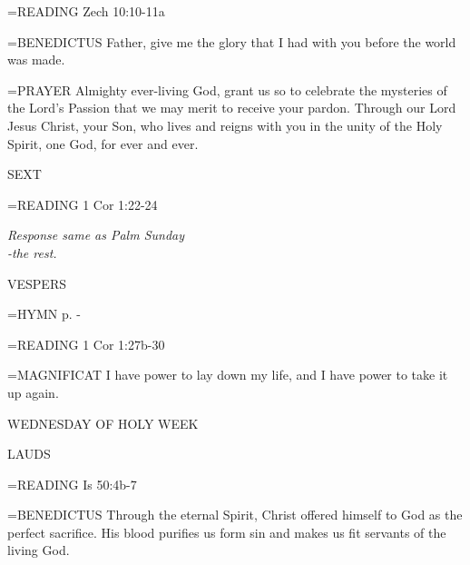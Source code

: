 \hangindent=\parindent \small{\uppercase{READING}}    Zech 10:10-11a \textbf{   \\}

\hangindent=\parindent \small{BENEDICTUS 	Father, give me the glory that I had with you before the world was made.\\}

\hangindent=\parindent \small{PRAYER 	Almighty ever-living God, grant us so to celebrate the mysteries of the Lord's Passion that we may merit to receive your pardon. Through our Lord Jesus Christ, your Son, who lives and reigns with you in the unity of the Holy Spirit, one God, for ever and ever.}

\begin{flushleft}\normalsize SEXT\\\end{flushleft}

\hangindent=\parindent \small{\uppercase{READING}}    1 Cor 1:22-24 \textbf{   \\}

\begin{center}
\textit{Response same as Palm Sunday\\
-the rest.}
\end{center}

\begin{flushleft}\normalsize VESPERS\\\end{flushleft}

\hangindent=\parindent \small{\uppercase{HYMN} p. \pageref{lent:firstHymn}-\pageref{lent:lastHymn}\\}

\hangindent=\parindent \small{\uppercase{READING}}    1 Cor 1:27b-30 \textbf{   \\}

\hangindent=\parindent \small{MAGNIFICAT 	I have power to lay down my life, and I have power to take it up again.\\}

WEDNESDAY OF HOLY WEEK

\begin{flushleft}\normalsize LAUDS\\\end{flushleft}

\hangindent=\parindent \small{\uppercase{READING}}    Is 50:4b-7 \textbf{   \\}

\hangindent=\parindent \small{BENEDICTUS 	Through the eternal Spirit, Christ offered himself to God as the perfect sacrifice. His blood purifies us form sin and makes us fit servants of the living God.\\}

